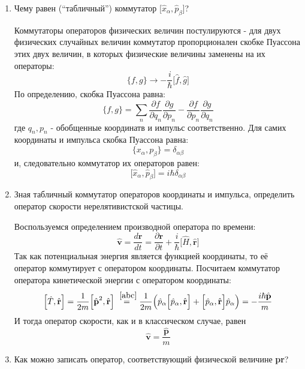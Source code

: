 \documentclass{article}
\begin{document}
\begin{enumerate}
	\item {Чему равен (“табличный”) коммутатор $\big[\hat{x}_\alpha, \hat{p}_\beta \big]$?}
	
	Коммутаторы операторов физических величин постулируются - для двух физических случайных величин коммутатор пропорционален скобке Пуассона этих двух величин, в которых физические величины заменены на их операторы:
	\begin{equation}
		\Big\{ f, g \Big\} \rightarrow -\frac{i}{\hbar} \Big[\hat{f}, \hat{g}\Big]
	\end{equation}
	По определению, скобка Пуассона равна:
	\begin{equation}
		\Big\{ f, g \Big\} = \sum\limits_n \frac{\partial f}{\partial q_n} \frac{\partial g}{\partial p_n} - \frac{\partial f}{\partial p_n} \frac{\partial g}{\partial q_n}
	\end{equation}
	где $q_n, p_n$ - обобщенные координатв и импульс соответственно. Для самих координаты и импульса скобка Пуассона равна:
	\begin{equation}
		\Big\{ x_\alpha, p_\beta \Big\} = \delta_{\alpha \beta}
	\end{equation}
	и, следовательно коммутатор их операторов равен:
	\begin{equation}
		\big[\hat{x}_\alpha, \hat{p}_\beta \big] = i\hbar \delta_{\alpha\beta}
	\end{equation}
	
	\item {Зная табличный коммутатор операторов координаты и импульса, определить оператор скорости нерелятивистской частицы.}
	
	Воспользуемся определением производной оператора по времени:
	\begin{equation}
		\hat{\textbf{v}} = \frac{d \textbf{r}}{dt} = \frac{\partial \textbf{r}}{\partial t} + \frac{i}{\hbar} \Big[ \hat{H}, \hat{\textbf{r}} \Big]
	\end{equation}
	Так как потенциальная энергия является функцией координаты, то её оператор коммутирует с оператором координаты. Посчитаем коммутатор оператора кинетической энергии с оператором координаты:
	\begin{equation}
		\Big[ \hat{T}, \hat{\textbf{r}} \Big] = \frac{1}{2m} \Big[ \hat{\textbf{p}}^2, \hat{\textbf{r}} \Big] \stackrel{~\eqref{abc}}{=} \frac{1}{2m} \Big(\hat{p}_\alpha \Big[\hat{p}_\alpha, \hat{\textbf{r}}\Big] + \Big[\hat{p}_\alpha, \hat{\textbf{r}}\Big]\hat{p}_\alpha \Big) = -\frac{i\hbar\hat{\textbf{p}}}{m}
	\end{equation}
	И тогда оператор скорости, как и в классическом случае, равен
	\begin{equation}
		\hat{\textbf{v}} = \frac{\hat{\textbf{p}}}{m}
	\end{equation}
	\item {Как можно записать оператор, соответствующий физической величине \textbf{pr}?}
	

\end{enumerate}
\end{document}
